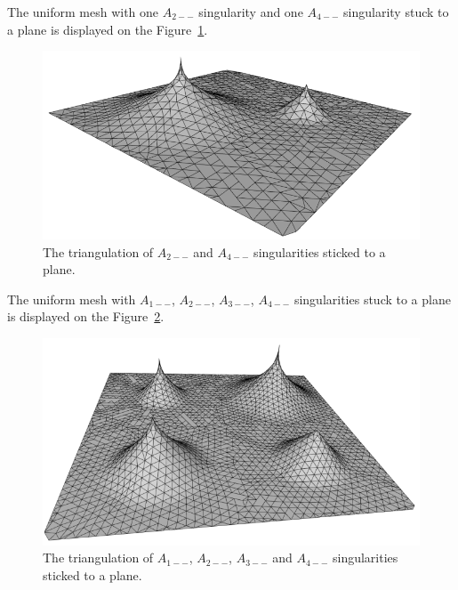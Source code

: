 The uniform mesh with one $A_{2--}$ singularity and one $A_{4--}$ singularity
stuck to a plane is displayed on the Figure~\ref{img:86}.

\begin{figure}[h!]
    \centerline{\includegraphics[scale=0.5]{images/img86}}
    \caption[The triangulation of $A_{2--}$ and $A_{4--}$ singularities sticked to a plane]
    {The triangulation of  $A_{2--}$ and $A_{4--}$ singularities sticked to a plane.}
    \label{img:86}
\end{figure}

The uniform mesh with $A_{1--}$, $A_{2--}$, $A_{3--}$, $A_{4--}$ singularities
stuck to a plane is displayed on the Figure~\ref{img:87}.

\begin{figure}[h!]
    \centerline{\includegraphics[scale=0.5]{images/img87}}
    \caption[The triangulation of $A_{1--}$, $A_{2--}$, $A_{3--}$ and $A_{4--}$ singularities sticked to a plane]
    {The triangulation of $A_{1--}$, $A_{2--}$, $A_{3--}$ and $A_{4--}$ singularities sticked to a plane.}
    \label{img:87}
\end{figure}

